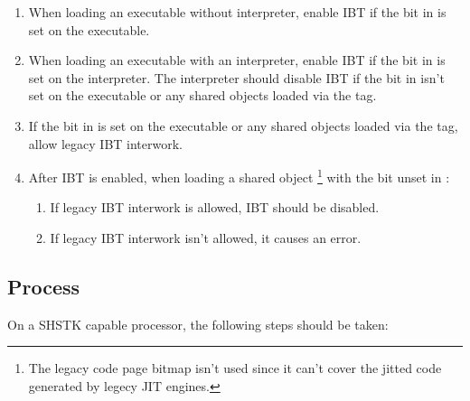 \begin{enumerate}
  \item
    \begin{sloppypar}
      When loading an executable without interpreter, enable IBT if
      the  bit in
       is set on the executable.
    \end{sloppypar}
  \item
    \begin{sloppypar}
      When loading an executable with an interpreter, enable IBT if
      the  bit in
       is set on the interpreter.
      The interpreter should disable IBT if the
       bit in
       isn't set on the executable
      or any shared objects loaded via the  tag.
    \end{sloppypar}
   \item If the  bit in
      is set on the
     executable or any shared objects loaded via the
      tag, allow legacy IBT interwork.
  \item
    \begin{sloppypar}
      After IBT is enabled, when loading a shared object
      \footnote{The legacy code page bitmap isn't used since it can't
      cover the jitted code generated by legecy JIT engines.}
      with the  bit unset in
      :
    \end{sloppypar}
    \begin{enumerate}
      \item If legacy IBT interwork is allowed, IBT should be disabled.
      \item If legacy IBT interwork isn't allowed, it causes an error.
    \end{enumerate}
\end{enumerate}

\subsection{Process }
\label{shstk}

On a SHSTK capable processor, the following steps should be taken:

